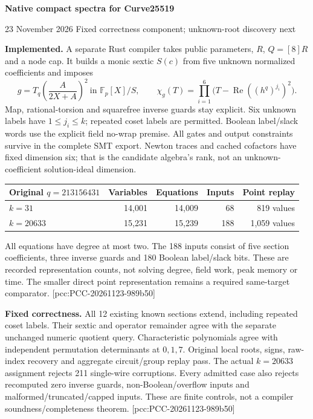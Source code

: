 \documentclass[10pt]{article}
\begin{document}
{\Large\bfseries\color{ink} Native compact spectra for Curve25519}\par
{\small 23 November 2026 \quad Fixed correctness component; unknown-root discovery next}

\textbf{Implemented.} A separate Rust compiler takes public parameters,
$R$, $Q=[8]R$ and a node cap. It builds a monic sextic $S(c)$ from five
unknown normalized coefficients and imposes
\[
 g=T_q\!\left(\frac{A}{2X+A}\right)^2\ \text{in }\mathbb F_p[X]/S,
 \qquad \chi_g(T)=\prod_{i=1}^6\bigl(T-\operatorname{Re}((h^q)^{j_i})^2\bigr).
\]
Map, rational-torsion and squarefree inverse guards stay explicit. Six unknown
labels have $1\le j_i\le k$; repeated coset labels are permitted. Boolean
label/slack words use the explicit field no-wrap premise. All gates and output
constraints survive in the complete SMT export. Newton traces and cached
cofactors have fixed dimension six; that is the candidate algebra's rank,
not an unknown-coefficient solution-ideal dimension.

\begin{center}
\begin{tabular}{lrrrr}
\toprule
Original $q=213156431$ & Variables & Equations & Inputs & Point replay\\
\midrule
$k=31$ & 14,001 & 14,009 & 68 & 819 values\\
$k=20633$ & 15,231 & 15,239 & 188 & 1,059 values\\
\bottomrule
\end{tabular}
\end{center}
All equations have degree at most two. The 188 inputs consist of five section
coefficients, three inverse guards and 180 Boolean label/slack bits.
These are recorded representation counts, not solving degree, field work,
peak memory or time. The smaller direct point representation remains a
required same-target comparator. [pcc:PCC-20261123-989b50]

\textbf{Fixed correctness.} All 12 existing known sections extend, including
repeated coset labels. Their sextic and operator remainder agree with the
separate unchanged numeric quotient query. Characteristic polynomials agree
with independent permutation determinants at $0,1,7$. Original local roots,
signs, raw-index recovery and aggregate circuit/group replay pass. The actual
$k=20633$ assignment rejects 211 single-wire corruptions. Every admitted case
also rejects recomputed zero inverse guards, non-Boolean/overflow inputs and
malformed/truncated/capped inputs. These are finite controls, not a compiler
soundness/completeness theorem. [pcc:PCC-20261123-989b50]
\end{document}

